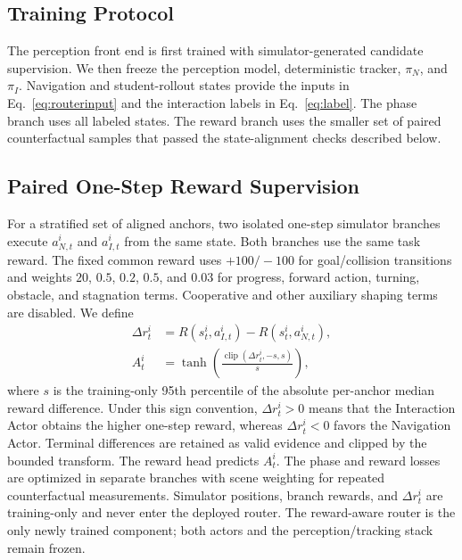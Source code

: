 \documentclass[letterpaper,10pt,conference]{ieeeconf}
\begin{document}
\subsection{Training Protocol}
The perception front end is first trained with simulator-generated candidate supervision. We then freeze the perception model, deterministic tracker, $\pi_N$, and $\pi_I$. Navigation and student-rollout states provide the inputs in Eq.~\eqref{eq:routerinput} and the interaction labels in Eq.~\eqref{eq:label}. The phase branch uses all labeled states. The reward branch uses the smaller set of paired counterfactual samples that passed the state-alignment checks described below.

\subsection{Paired One-Step Reward Supervision}
For a stratified set of aligned anchors, two isolated one-step simulator branches execute $a_{N,t}^i$ and $a_{I,t}^i$ from the same state. Both branches use the same task reward. The fixed common reward uses $+100/-100$ for goal/collision transitions and weights $20$, $0.5$, $0.2$, $0.5$, and $0.03$ for progress, forward action, turning, obstacle, and stagnation terms. Cooperative and other auxiliary shaping terms are disabled. We define
\begin{equation}
 \begin{aligned}
 \Delta r_t^i&=R(s_t^i,a_{I,t}^i)-R(s_t^i,a_{N,t}^i),\\
 A_t^i&=\tanh\!\left(\frac{\operatorname{clip}(\Delta r_t^i,-s,s)}{s}\right),
 \end{aligned}
 \label{eq:rewardtarget}
\end{equation}
where $s$ is the training-only 95th percentile of the absolute per-anchor median reward difference. Under this sign convention, $\Delta r_t^i>0$ means that the Interaction Actor obtains the higher one-step reward, whereas $\Delta r_t^i<0$ favors the Navigation Actor. Terminal differences are retained as valid evidence and clipped by the bounded transform. The reward head predicts $A_t^i$. The phase and reward losses are optimized in separate branches with scene weighting for repeated counterfactual measurements. Simulator positions, branch rewards, and $\Delta r_t^i$ are training-only and never enter the deployed router. The reward-aware router is the only newly trained component; both actors and the perception/tracking stack remain frozen.
\end{document}
